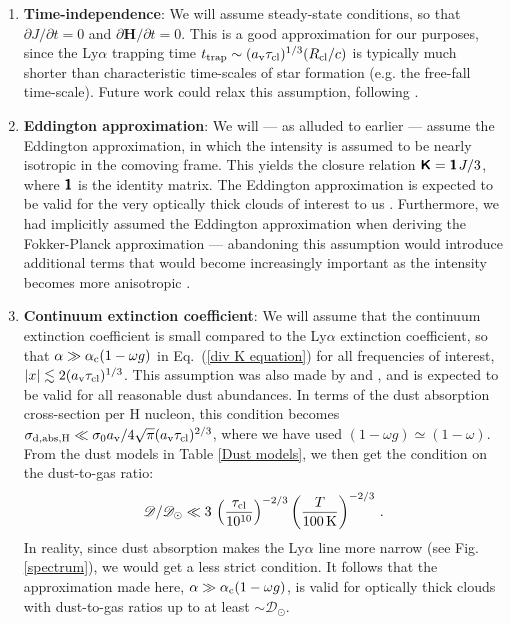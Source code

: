 \documentclass[fleqn,usenatbib]{mnras}
\newcommand{\taucl}{\tau_{\rm cl}}
\begin{document}
\begin{enumerate}
    \item \textbf{Time-independence}: We will assume steady-state conditions, so that $\partial J/\partial t = 0$ and $\partial \boldsymbol{H}/\partial t = 0$. This is a good approximation for our purposes, since the Ly$\alpha$ trapping time $t_{\rm trap} \sim (a_{\rm v} \taucl)^{1/3} (R_{\rm cl}/c)$ is typically much shorter than characteristic time-scales of star formation (e.g. the free-fall time-scale). Future work could relax this assumption, following \cite{McClellan2022}. \\
    
    \item \textbf{Eddington approximation}: We will --- as alluded to earlier --- assume the Eddington approximation, in which the intensity is assumed to be nearly isotropic in the comoving frame. This yields the closure relation $\textbf{\textsf{K}} = \textbf{\textsf{1}} \hspace{1 pt} J/3$, where $\textbf{\textsf{1}}$ is the identity matrix. The Eddington approximation is expected to be valid for the very optically thick clouds of interest to us \citep[for numerical tests see e.g.][]{Dijkstra2008, Smith2017}. Furthermore, we had implicitly assumed the Eddington approximation when deriving the Fokker-Planck approximation --- abandoning this assumption would introduce additional terms that would become increasingly important as the intensity becomes more anisotropic \citep{Rybicki1994}. \\
    
    \item \textbf{Continuum extinction coefficient}: We will assume that the continuum extinction coefficient is small compared to the Ly$\alpha$ extinction coefficient, so that $\alpha \gg \alpha_{\rm c}(1-\omega g)$ in Eq.~(\ref{div K equation}) for all frequencies of interest, $\lvert x \rvert \lesssim 2 (a_{\rm v}\taucl)^{1/3}$. This assumption was also made by \cite{Neufeld1990} and \cite{Tomaselli2021}, and is expected to be valid for all reasonable dust abundances. In terms of the dust absorption cross-section per H nucleon, this condition becomes $\sigma_{\rm d,abs,H} \ll \sigma_0 a_{\rm v}/4 \sqrt{\pi} (a_{\rm v} \taucl)^{2/3}$, where we have used $(1-\omega g) \simeq (1-\omega)$. From the dust models in Table \ref{Dust models}, we then get the condition on the dust-to-gas ratio: 
    \begin{equation}
        \mathscr{D}/\mathscr{D}_{\odot} \ll 3 \, \left( \dfrac{\taucl}{10^{10}} \right)^{-2/3} \left( \dfrac{T}{100 \, \rm K} \right)^{-2/3} \, .
    \end{equation}
    In reality, since dust absorption makes the Ly$\alpha$ line more narrow (see Fig. \ref{spectrum}), we would get a less strict condition. It follows that the approximation made here, $\alpha \gg \alpha_{\rm c}(1-\omega g)$, is valid for optically thick clouds with dust-to-gas ratios up to at least $\sim \mathscr{D}_{\odot}$.
    \\


\end{enumerate}
\end{document}
